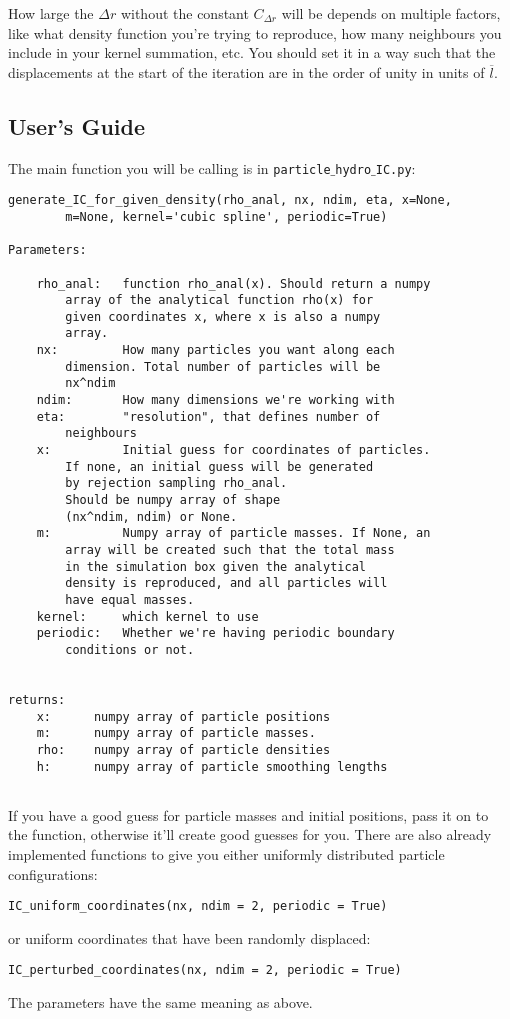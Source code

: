 How large the $\Delta r$ without the constant $C_{\Delta r}$ will be depends on multiple factors, like what density function you're trying to reproduce, how many neighbours you include in your kernel summation, etc.
You should set it in a way such that the displacements at the start of the iteration are in the order of unity in units of $\overline{l}$.










\subsection{User's Guide}

The main function you will be calling is in \mbox{\texttt{particle$\_$hydro$\_$IC.py}}:




\begin{lstlisting}
generate_IC_for_given_density(rho_anal, nx, ndim, eta, x=None, 
		m=None, kernel='cubic spline', periodic=True)
		
Parameters:

	rho_anal:   function rho_anal(x). Should return a numpy 
		array of the analytical function rho(x) for 
		given coordinates x, where x is also a numpy 
		array.
	nx:         How many particles you want along each 
		dimension. Total number of particles will be 
		nx^ndim
	ndim:       How many dimensions we're working with
	eta:        "resolution", that defines number of 
		neighbours
	x:          Initial guess for coordinates of particles. 
		If none, an initial guess will be generated
		by rejection sampling rho_anal.
		Should be numpy array of shape 
		(nx^ndim, ndim) or None.
	m:          Numpy array of particle masses. If None, an 
		array will be created such that the total mass 
		in the simulation box given the analytical 
		density is reproduced, and all particles will
		have equal masses.
	kernel:     which kernel to use
	periodic:   Whether we're having periodic boundary 
		conditions or not.

    
returns:
	x:      numpy array of particle positions
	m:      numpy array of particle masses.
	rho:    numpy array of particle densities
	h:      numpy array of particle smoothing lengths


\end{lstlisting}


If you have a good guess for particle masses and initial positions, pass it on to the function, otherwise it'll create good guesses for you.
There are also already implemented functions to give you either uniformly distributed particle configurations:
\begin{lstlisting}
IC_uniform_coordinates(nx, ndim = 2, periodic = True)
\end{lstlisting}
or uniform coordinates that have been randomly displaced:
\begin{lstlisting}
IC_perturbed_coordinates(nx, ndim = 2, periodic = True)
\end{lstlisting}
The parameters have the same meaning as above.



